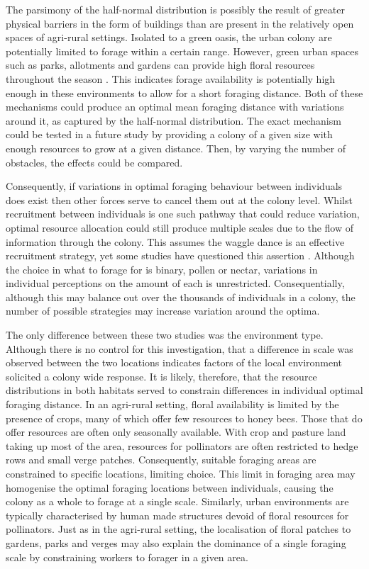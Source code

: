 \documentclass[11pt,usenames,dvipsnames]{article}
\begin{document}
The parsimony of the half-normal distribution is possibly the result of greater physical barriers in the form of buildings than are present in the relatively open spaces of agri-rural settings. Isolated to a green oasis, the urban colony are potentially limited to forage within a certain range. However, green urban spaces such as parks, allotments and gardens can provide high floral resources throughout the season \citep{Baldock2015, Baldock2019, Plascencia2017}. This indicates forage availability is potentially high enough in these environments to allow for a short foraging distance. Both of these mechanisms could produce an optimal mean foraging distance with variations around it, as captured by the half-normal distribution. The exact mechanism could be tested in a future study by providing a colony of a given size with enough resources to grow at a given distance. Then, by varying the number of obstacles, the effects could be compared. 





Consequently, if variations in optimal foraging behaviour between individuals does exist then other forces serve to cancel them out at the colony level. Whilst recruitment between individuals is one such pathway that could reduce variation, optimal resource allocation could still produce multiple scales due to the flow of information through the colony. This assumes the waggle dance is an effective recruitment strategy, yet some studies have questioned this assertion \citep{Gruter2008, Gruter2009}. Although the choice in what to forage for is binary, pollen or nectar, variations in individual perceptions on the amount of each is unrestricted. Consequentially, although this may balance out over the thousands of individuals in a colony, the number of possible strategies may increase variation around the optima.

The only difference between these two studies was the environment type. Although there is no control for this investigation, that a difference in scale was observed between the two locations indicates factors of the local environment solicited a colony wide response. It is likely, therefore, that the resource distributions in both habitats served to constrain differences in individual optimal foraging distance. In an agri-rural setting, floral availability is limited by the presence of crops, many of which offer few resources to honey bees. Those that do offer resources are often only seasonally available. With crop and pasture land taking up most of the area, resources for pollinators are often restricted to hedge rows and small verge patches. Consequently, suitable foraging areas are constrained to specific locations, limiting choice. This limit in foraging area may homogenise the optimal foraging locations between individuals, causing the colony as a whole to forage at a single scale. Similarly, urban environments are typically characterised by human made structures devoid of floral resources for pollinators. Just as in the agri-rural setting, the localisation of floral patches to gardens, parks and verges may also explain the dominance of a single foraging scale by constraining workers to forager in a given area. 
\end{document}
